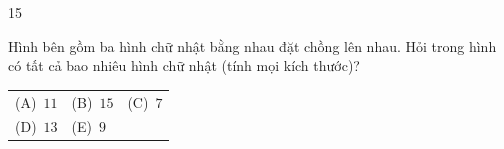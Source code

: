 \documentclass[11pt]{article}
\makeatletter
\newenvironment{probbox}[2]{\begin{probboxT}{#1}{#2}}{\end{probboxT}}
\newcommand{\choicesII}[5]{\par\smallskip\noindent
  \begin{tabularx}{\linewidth}{@{}XXX@{}}(A)\ #1&(B)\ #2&(C)\ #3\\(D)\ #4&(E)\ #5&\end{tabularx}\par}
\makeatother
\begin{document}
\begin{probbox}{15}{\relax}
\begin{minipage}[t]{0.52\linewidth}\vspace{0pt}
Hình bên gồm ba hình chữ nhật bằng nhau đặt chồng lên nhau. Hỏi trong hình có tất cả bao nhiêu hình chữ nhật (tính mọi kích thước)?
\choicesII{$11$}{$15$}{$7$}{$13$}{$9$}
\end{minipage}\hfill
\begin{minipage}[t]{0.44\linewidth}\vspace{0pt}
\centering{}
\end{minipage}
\end{probbox}
\end{document}
